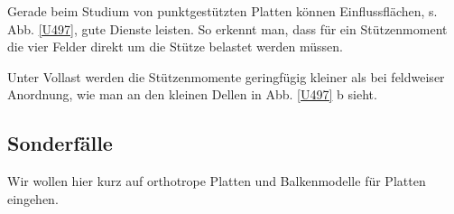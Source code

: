 Gerade beim Studium von punktgest\"{u}tzten Platten k\"{o}nnen Einflussfl\"{a}chen, s. Abb. \ref{U497}, gute Dienste leisten. So erkennt man, dass f\"{u}r ein St\"{u}tzenmoment die vier Felder direkt um die St\"{u}tze belastet werden m\"{u}ssen.

Unter Vollast werden die St\"{u}tzenmomente geringf\"{u}gig kleiner als bei feldweiser Anordnung, wie man an den kleinen Dellen in Abb. \ref{U497} b sieht.

\pagebreak
{\textcolor{sectionTitleBlue}{\section{Sonderf\"{a}lle}}}
Wir wollen hier kurz auf orthotrope Platten und Balkenmodelle f\"{u}r Platten eingehen.

